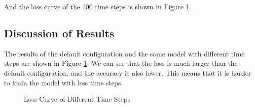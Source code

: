 And the loss curve of the 100 time steps is shown in Figure \ref{fig:loss_curve}.

\subsection{Discussion of Results}
The results of the default configuration and the same model with different time steps are shown in Figure \ref{fig:loss_curve}.
We can see that the loss is much larger than the default configuration, and the accuracy is also lower.
This means that it is harder to train the model with less time steps.


\begin{figure}[h]
    \caption{Loss Curve of Different Time Steps}
    \label{fig:loss_curve}
\end{figure}
